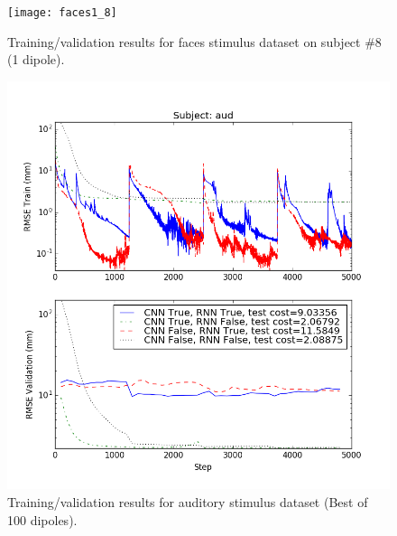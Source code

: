 \documentclass[journal,12pt,onecolumn,draftclsnofoot,]{IEEEtran}
\begin{document}
\begin{figure}[!h]
\centering
\texttt{[image: faces1\_8]}
\caption{Training/validation results for faces stimulus dataset on subject \#8 (1 dipole).}
\label{fig:faces_8}
\end{figure}

\begin{figure}[!h]
\centering
\includegraphics[width=6.75in]{aud100}
\caption{Training/validation results for auditory stimulus dataset (Best of 100 dipoles).}
\label{fig:aud100}
\end{figure}
\end{document}
